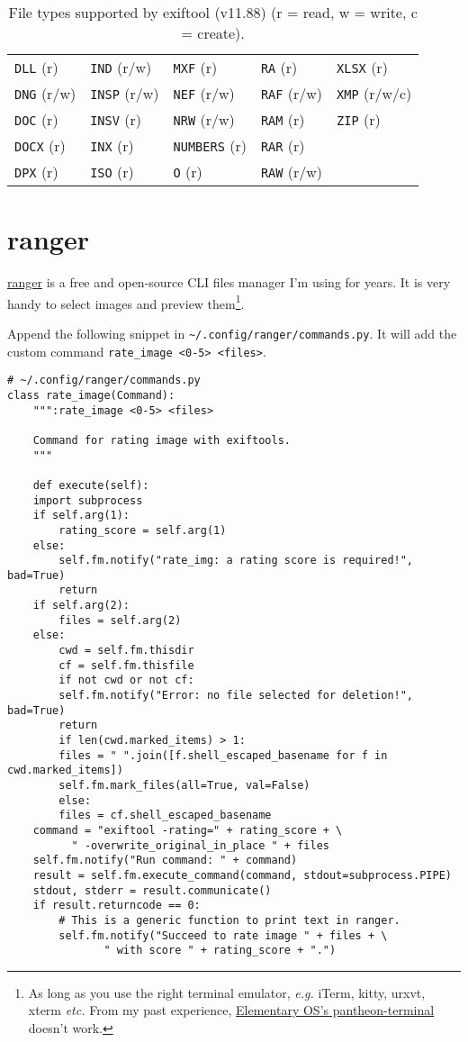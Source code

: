 \documentclass[11pt]{article}
\begin{document}
\begin{table}[htbp]
\begin{tabular}{|l|l|l|l|l|}
\texttt{DLL}   (r) & \texttt{IND}   (r/w) & \texttt{MXF}   (r) & \texttt{RA}    (r) & \texttt{XLSX}  (r)\\
\texttt{DNG}   (r/w) & \texttt{INSP}  (r/w) & \texttt{NEF}   (r/w) & \texttt{RAF}   (r/w) & \texttt{XMP}   (r/w/c)\\
\texttt{DOC}   (r) & \texttt{INSV}  (r) & \texttt{NRW}   (r/w) & \texttt{RAM}   (r) & \texttt{ZIP}   (r)\\
\texttt{DOCX}  (r) & \texttt{INX}   (r) & \texttt{NUMBERS} (r) & \texttt{RAR}   (r) & \\
\texttt{DPX}   (r) & \texttt{ISO}   (r) & \texttt{O}     (r) & \texttt{RAW}   (r/w) & \\
\hline
\end{tabular}
\caption{File types supported by exiftool (v11.88) (r = read, w = write, c = create).}

\end{table}

\section{ranger}
\label{sec:orga9d3806}
\href{https://github.com/ranger/ranger/}{ranger} is a free and open-source CLI files manager I'm using for years. It is very handy to select
images and preview them\footnote{As long as you use the right terminal emulator, \emph{e.g.} iTerm, kitty,
urxvt, xterm \emph{etc.} From my past experience, \href{https://github.com/elementary/terminal}{Elementary OS's pantheon-terminal} doesn't work.}. 

Append the following snippet in \texttt{\textasciitilde{}/.config/ranger/commands.py}.
It will add the custom command \texttt{rate\_image <0-5> <files>}.
\begin{verbatim}
# ~/.config/ranger/commands.py
class rate_image(Command):
    """:rate_image <0-5> <files> 

    Command for rating image with exiftools.
    """

    def execute(self):
	import subprocess
	if self.arg(1):
	    rating_score = self.arg(1)
	else:
	    self.fm.notify("rate_img: a rating score is required!", bad=True)
	    return
	if self.arg(2):
	    files = self.arg(2)
	else:
	    cwd = self.fm.thisdir
	    cf = self.fm.thisfile
	    if not cwd or not cf:
		self.fm.notify("Error: no file selected for deletion!", bad=True)
		return
	    if len(cwd.marked_items) > 1:
		files = " ".join([f.shell_escaped_basename for f in cwd.marked_items])
		self.fm.mark_files(all=True, val=False)
	    else:
		files = cf.shell_escaped_basename
	command = "exiftool -rating=" + rating_score + \
		  " -overwrite_original_in_place " + files
	self.fm.notify("Run command: " + command)
	result = self.fm.execute_command(command, stdout=subprocess.PIPE)
	stdout, stderr = result.communicate()
	if result.returncode == 0:
	    # This is a generic function to print text in ranger.  
	    self.fm.notify("Succeed to rate image " + files + \
			   " with score " + rating_score + ".")
\end{verbatim}
\end{document}
